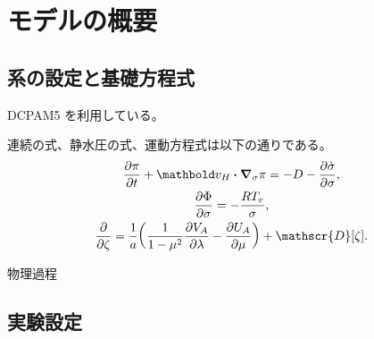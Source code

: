 \documentclass[body]{subfiles}
\begin{document}
\chapter{モデルの概要}

\section{系の設定と基礎方程式}
DCPAM5 を利用している。

連続の式、静水圧の式、運動方程式は以下の通りである。
\begin{gather}
	\pdv{\pi}{t}+\vc{v}_H\vdot\grad_\sigma\pi=-D-\pdv{\dot\sigma}{\sigma},\\
	\pdv{\Phi}{\sigma}=-\frac{RT_v}{\sigma},\\
	\pdv{\zeta}=\frac{1}{a}\qty(\frac{1}{1-\mu^2}\pdv{V_A}{\lambda}-\pdv{U_A}{\mu})+\mathscr{D}[\zeta].\\
\end{gather}

物理過程

\section{実験設定}
\end{document}
